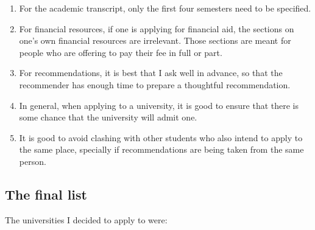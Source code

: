 \documentclass[a4paper]{amsart}
\begin{document}
\begin{enumerate}

\item For the academic transcript, only the first four semesters need
  to be specified.

\item For financial resources, if one is applying for financial aid,
  the sections on one's own financial resources are irrelevant. Those
  sections are meant for people who are offering to pay their fee in full
  or part.

\item For recommendations, it is best that I ask well in advance, so
  that the recommender has enough time to prepare a thoughtful
  recommendation.

\item In general, when applying to a university, it is good to ensure
  that there is some chance that the university will admit one.

\item It is good to avoid clashing with other students who also
  intend to apply to the same place, specially if recommendations
  are being taken from the same person.

\end{enumerate}

\subsection{The final list}

The universities I decided to apply to were:
\end{document}
